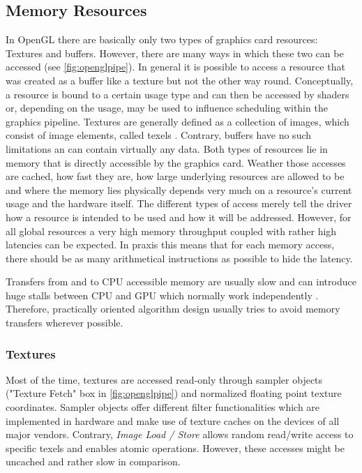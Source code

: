 \documentclass[thesis.tex]{subfiles}
\begin{document}
\subsection{Memory Resources} \label{sec:preq:memory}
In OpenGL there are basically only two types of graphics card resources: Textures and buffers.
However, there are many ways in which these two can be accessed (see \autoref{fig:openglpipe}).
In general it is possible to access a resource that was created as a buffer like a texture but not the other way round.
Conceptually, a resource is bound to a certain usage type and can then be accessed by shaders or, depending on the usage, may be used to influence scheduling within the graphics pipeline.
Textures are generally defined as a collection of images, which consist of image elements, called texels \cite[p.~29]{bib:openglspec}.
Contrary, buffers have no such limitations an can contain virtually any data.
Both types of resources lie in memory that is directly accessible by the graphics card.
Weather those accesses are cached, how fast they are, how large underlying resources are allowed to be and where the memory lies physically depends very much on a resource's current usage and the hardware itself.
The different types of access merely tell the driver how a resource is intended to be used and how it will be addressed.
However, for all global resources a very high memory throughput coupled with rather high latencies can be expected.
In praxis this means that for each memory access, there should be as many arithmetical instructions as possible to hide the latency.

Transfers from and to CPU accessible memory are usually slow and can introduce huge stalls between CPU and GPU which normally work independently \cite{bib:openglinsightstransfer}.
Therefore, practically oriented algorithm design usually tries to avoid memory transfers wherever possible.

\subsubsection{Textures}
Most of the time, textures are accessed read-only through sampler objects ("Texture Fetch" box in \autoref{fig:openglpipe}) and normalized floating point texture coordinates.
Sampler objects offer different filter functionalities which are implemented in hardware and make use of texture caches on the devices of all major vendors.
Contrary, \emph{Image Load / Store} allows random read/write access to specific texels and enables atomic operations.
However, these accesses might be uncached and rather slow in comparison.
\end{document}
